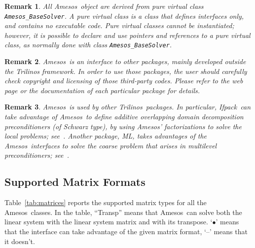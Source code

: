 \documentclass[11pt]{SANDreport}
\newcommand{\amesos}{{\sc Amesos}}
\newcommand{\ml}{{\sc ML}}
\newcommand{\ifpack}{{\sc Ifpack}}
\newcommand{\trilinos}{{\sc Trilinos}}
\newtheorem{remark}{Remark}
\begin{document}
\begin{remark}
All \amesos\ object are derived from pure virtual class 
\verb!Amesos_BaseSolver!. A pure virtual class is a class that
defines interfaces only, and contains no executable code. Pure virtual classes cannot
be instantiated; however, it is possible to declare and use pointers and
references to a pure virtual class, as normally done with class
{\tt Amesos\_BaseSolver}.
\end{remark}  

\begin{remark}
\amesos\ is an interface to other
  packages, mainly developed outside the Trilinos framework. In order to
  use those packages, the user should carefully check copyright and
  licensing of those third-party codes.  Please refer to the web page or
  the documentation of each particular package for details.
\end{remark}  
  
\begin{remark}
\amesos\ is used by other \trilinos\ packages. In particular, \ifpack\
  can take advantage of \amesos\ to define additive overlapping domain
  decomposition preconditioners (of Schwarz type), by using \amesos'
  factorizations to solve the local problems; see~\cite{ifpack-guide}.
Another package, \ml, takes
advantages of the \amesos\ interfaces to solve the coarse problem
that arises in multilevel preconditioners; see~\cite{ml-guide}.
\end{remark}

\subsection{Supported Matrix Formats}
\label{sec:matrix}

Table~\ref{tab:matrices} reports the supported matrix types for all the 
\amesos\ classes. In the table, ``Transp'' means that \amesos\ 
can solve both the linear system with the linear system matrix and with 
its transpose.  `$\bullet$' means that the interface can take advantage of the given matrix 
format, `--' means that it doesn't.
\end{document}
